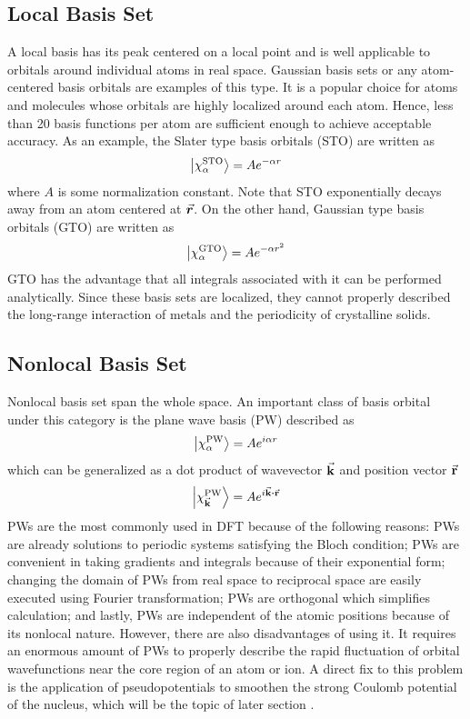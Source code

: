 \subsection{Local Basis Set}
A local basis has its peak centered on a local point and is well applicable to orbitals around individual atoms in real space. Gaussian basis sets or any atom-centered basis orbitals are examples of this type. It is a popular choice for atoms and molecules whose orbitals are highly localized around each atom.
Hence, less than 20 basis functions per atom are sufficient enough to achieve acceptable accuracy. As an example, the Slater type basis orbitals (STO) are written as \citep{Slater1932}
\begin{equation}
    \ket{\chi^{\text{STO}}_\alpha} = A e^{-\alpha r}
\end{equation}
where $A$ is some normalization constant. Note that STO exponentially decays away from an atom centered at $\va*{r}$. On the other hand, Gaussian type basis orbitals (GTO)  are written as \citep{Boys1950}
\begin{equation}
    \ket{\chi^{\text{GTO}}_\alpha} = A e^{-\alpha r^2}
\end{equation}
GTO has the advantage that all integrals associated with it can be performed analytically. Since these basis sets are localized, they cannot properly described the long-range interaction of metals and the periodicity of crystalline solids. 

\subsection{Nonlocal Basis Set}
Nonlocal basis set span the whole space. An important class of basis orbital under this category is the plane wave basis (PW) described as 
\begin{equation}
    \ket{\chi^{\text{PW}}_\alpha} = A e^{i \alpha r}
\end{equation}
which can be generalized as a dot product of wavevector $\va{k}$ and position vector $\va{r}$
\begin{equation}
    \ket{\chi^{\text{PW}}_{\va{k}}} = A e^{i \va{k} \vdot \va{r}}
\end{equation}
PWs are the most commonly used in DFT  because of the following reasons: PWs are already solutions to periodic systems satisfying the Bloch condition; PWs are convenient  in taking gradients and integrals because of their exponential form; changing the domain of PWs from  real space to reciprocal space are easily executed using Fourier transformation; PWs are orthogonal which simplifies calculation; and lastly, PWs are independent of the atomic positions because of its nonlocal nature. However, there are also disadvantages of using it. It requires an enormous amount of PWs to properly describe the rapid fluctuation of orbital wavefunctions near the core region of an atom or ion. A direct fix to this problem is the application of pseudopotentials to smoothen the strong Coulomb potential of the nucleus, which will be the topic of later section \citep{Segall2002}. 

